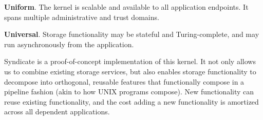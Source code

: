 \textbf{Uniform}.  The kernel is scalable and available to all
application endpoints. It spans multiple administrative and trust
domains.

\textbf{Universal}.  Storage functionality may be stateful and
Turing-complete, and may run asynchronously from the application.

Syndicate is a proof-of-concept implementation of this kernel. It not only
allows us to combine existing storage services, but also enables storage
functionality to decompose into orthogonal, reusable features that
functionally compose in a pipeline fashion (akin to how UNIX programs
compose).  New functionality can reuse existing functionality, and the
cost adding a new functionality is amortized across all dependent applications.
